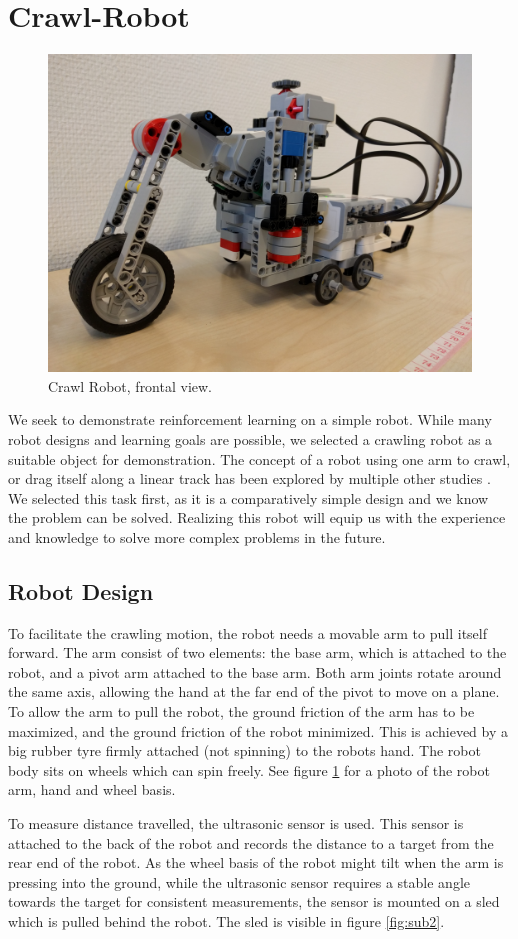 \documentclass[11pt, a4paper]{article}
\begin{document}
\pagebreak
\section{Crawl-Robot}
\begin{figure}[H]
	\centering
	\includegraphics[width=0.6\linewidth]{images/crawl_robot}
	\caption{Crawl Robot, frontal view.}
	\label{fig:crawl_robot}
\end{figure}
We seek to demonstrate reinforcement learning on a simple robot. While many robot designs and learning goals are possible, we selected a crawling robot as a suitable object for demonstration. The concept of a robot using one arm to crawl, or drag itself along a linear track has been explored by multiple other studies \cite{youtube_crawl2} \cite{youtube_crawl}. We selected this task first, as it is a comparatively simple design and we know the problem can be solved. Realizing this robot will equip us with the experience and knowledge to solve more complex problems in the future.


\subsection{Robot Design}
To facilitate the crawling motion, the robot needs a movable arm to pull itself forward. The arm consist of two elements: the base arm, which is attached to the robot, and a pivot arm attached to the base arm. Both arm joints rotate around the same axis, allowing the hand at the far end of the pivot to move on a plane. To allow the arm to pull the robot, the ground friction of the arm has to be maximized, and the ground friction of the robot minimized. This is achieved by a big rubber tyre firmly attached (not spinning) to the robots hand. The robot body sits on wheels which can spin freely. See figure \ref{fig:crawl_robot} for a photo of the robot arm, hand and wheel basis.

To measure distance travelled, the ultrasonic sensor is used. This sensor is attached to the back of the robot and records the distance to a target from the rear end of the robot. As the wheel basis of the robot might tilt when the arm is pressing into the ground, while the ultrasonic sensor requires a stable angle towards the target for consistent measurements, the sensor is mounted on a sled which is pulled behind the robot. The sled is visible in figure \ref{fig:sub2}.
\end{document}
